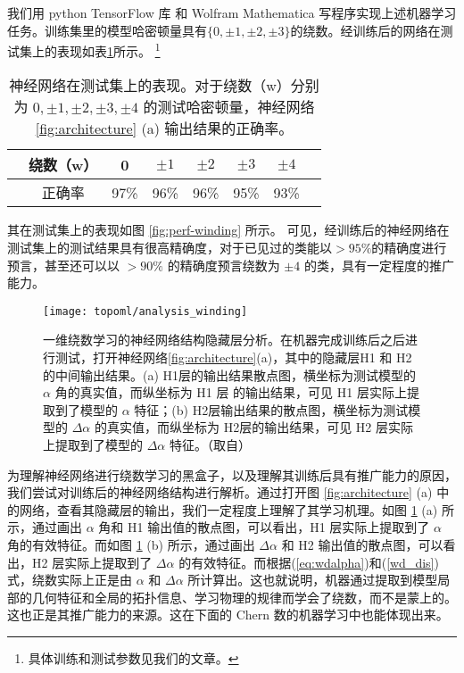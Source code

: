 我们用 python TensorFlow 库 和 Wolfram Mathematica 写程序实现上述机器学习任务。训练集里的模型哈密顿量具有$\{0, \pm1, \pm2, \pm3\}$的绕数。经训练后的网络在测试集上的表现如表\ref{table:winding-sr}所示。
\footnote{具体训练和测试参数见我们的文章。}
\begin{table}[t]
\caption{神经网络在测试集上的表现。对于绕数（w）分别为 $0, \pm1, \pm2, \pm3, \pm4$ 的测试哈密顿量，神经网络 \ref{fig:architecture} (a) 输出结果的正确率。 }\label{table:winding-sr}
\centering
\begin{tabular}{*{8}c}
\hline\hline
& 绕数（w） & 0 & $\pm1$ & $\pm2$ & $\pm3$ & $\pm4$ & \\ \hline
& 正确率 & 97\% & 96\% & 96\% & 95\% & 93\% & \\
\hline\hline
\end{tabular}
\end{table}
其在测试集上的表现如图 \ref{fig:perf-winding} 所示。
可见，经训练后的神经网络在测试集上的测试结果具有很高精确度，对于已见过的类能以$>95\%$的精确度进行预言，甚至还可以以 $>90\%$ 的精确度预言绕数为 $\pm4$ 的类，具有一定程度的推广能力。




\begin{figure}[t]
\centering
\texttt{[image: topoml/analysis\_winding]}
\caption{一维绕数学习的神经网络结构隐藏层分析。在机器完成训练后之后进行测试，打开神经网络\ref{fig:architecture}(a)，其中的隐藏层H1 和 H2 的中间输出结果。(a) H1层的输出结果散点图，横坐标为测试模型的 $\alpha$ 角的真实值，而纵坐标为 H1 层 的输出结果，可见 H1 层实际上提取到了模型的 $\alpha$ 特征；(b) H2层输出结果的散点图，横坐标为测试模型的 $\Delta\alpha$ 的真实值，而纵坐标为 H2层的输出结果，可见 H2 层实际上提取到了模型的 $\Delta\alpha$ 特征。（取自）}
\label{fig:anal-winding}
\end{figure}



为理解神经网络进行绕数学习的黑盒子，以及理解其训练后具有推广能力的原因，我们尝试对训练后的神经网络结构进行解析。通过打开图 \ref{fig:architecture} (a) 中的网络，查看其隐藏层的输出，我们一定程度上理解了其学习机理。如图 \ref{fig:anal-winding} (a) 所示，通过画出 $\alpha$ 角和 H1 输出值的散点图，可以看出，H1 层实际上提取到了 $\alpha$ 角的有效特征。而如图 \ref{fig:anal-winding} (b) 所示，通过画出 $\Delta\alpha$ 和 H2 输出值的散点图，可以看出，H2 层实际上提取到了 $\Delta\alpha$ 的有效特征。而根据(\ref{eq:wdalpha})和(\ref{wd_dis})式，绕数实际上正是由 $\alpha$ 和 $\Delta\alpha$ 所计算出。这也就说明，机器通过提取到模型局部的几何特征和全局的拓扑信息、学习物理的规律而学会了绕数，而不是蒙上的。这也正是其推广能力的来源。这在下面的 Chern 数的机器学习中也能体现出来。




